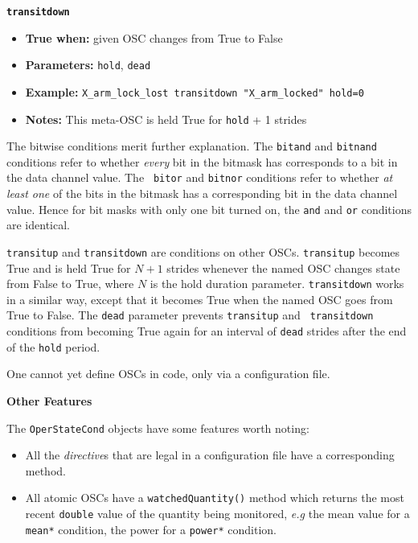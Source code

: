 \documentclass[11pt]{article}
\begin{document}
{\large\texttt{\textbf{transitdown}}}

\begin{itemize}
\item \textbf{True when:} given OSC changes from True to False
\item \textbf{Parameters:} \texttt{hold}, \texttt{dead}
\item \textbf{Example:} \texttt{X\_arm\_lock\_lost  transitdown
    "X\_arm\_locked" hold=0}
\item \textbf{Notes:} This meta-OSC is held True for \texttt{hold} + 1 strides
\end{itemize}

The bitwise conditions merit further explanation. The \texttt{bitand} and
\texttt{bitnand} conditions refer to whether \textit{every} bit in the
bitmask has corresponds to a bit in the data channel value. The \texttt{
bitor} and \texttt{bitnor} conditions refer to whether \textit{at least one}
of the bits in the bitmask has a corresponding bit in the data channel
value. Hence for bit masks with only one bit turned on, the \texttt{and}
and \texttt{or} conditions are identical.

\texttt{transitup} and \texttt{transitdown} are conditions on other
OSCs. \texttt{transitup} becomes True and is held True for $N+1$ strides
whenever the named OSC changes state from False to True, where $N$ is
the hold duration parameter. \texttt{transitdown} works in a similar way,
except that it becomes True when the named OSC goes from True to
False.  The \texttt{dead} parameter prevents \texttt{transitup} and \texttt{
transitdown} conditions from becoming True again for an interval of
\texttt{dead} strides after the end of the \texttt{hold} period.

One cannot yet define OSCs in code, only via a configuration file.


\begin{center}
  \textbf{{\large Other Features}}
\end{center}

The \texttt{OperStateCond} objects have some features worth noting:

\begin{itemize}
\item All the \textit{directive}s that are legal in a configuration file have
   a corresponding method.
\item All atomic OSCs have a \texttt{watchedQuantity()} method which returns
   the most recent \texttt{double} value of the quantity being monitored,
   \textit{e.g} the mean value for a \texttt{mean*} condition, the
   power for a \texttt{power*} condition.
\end{itemize}
\end{document}
